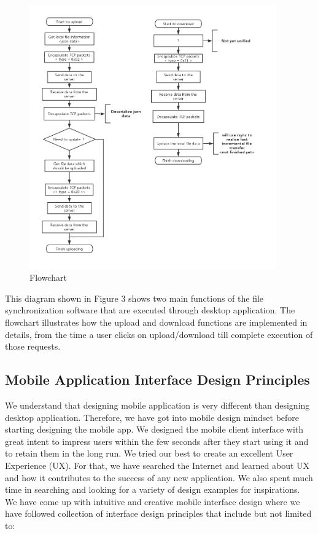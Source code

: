 \documentclass{article}
\begin{document}
\begin{figure}[h]
    \centering
    \includegraphics[width=0.95\textwidth]{flowchart}
    \caption{Flowchart}
    \label{fig:flowchart1}
\end{figure}

\newline
\hfill \break

This diagram shown in Figure 3 shows two main functions of the file synchronization software that are executed through desktop application.
The flowchart illustrates how the upload and download functions are implemented in details, from the time a user clicks on upload/download till complete execution of those requests.

\subsection{Mobile Application Interface Design Principles}
We understand that designing mobile application is very different than designing desktop application.
Therefore, we have got into mobile design mindset before starting designing the mobile app.
We designed the mobile client interface with great intent to impress users within the few seconds after they start using it and to retain them in the long run. We tried our best to create an excellent User Experience (UX). For that, we have searched the Internet and learned about UX and how it contributes to the success of any new application. We also spent much time in searching and looking for a variety of design examples for inspirations. We have come up with intuitive and creative mobile interface design where we have followed collection of interface design principles that include but not limited to:
\end{document}
